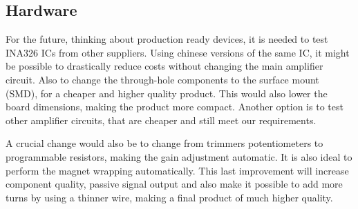 \subsection{Hardware}
For the future, thinking about production ready devices, it is needed to test INA326 ICs
from other suppliers. Using chinese versions of the same IC, it might be possible to
drastically reduce costs without changing the main amplifier circuit.
Also to change the through-hole components to the surface mount (SMD), for a cheaper and higher
quality  product. This would also lower the board dimensions, making the product more compact.
Another option is to test other amplifier circuits, that are cheaper and still meet our requirements.

A crucial change would also be to change from trimmers potentiometers to programmable
resistors, making the gain adjustment automatic.
It is also ideal to perform the magnet wrapping automatically. This last improvement will increase
component quality, passive signal output and also make it possible
to add more turns by using a thinner wire, making a final product of much higher quality.


